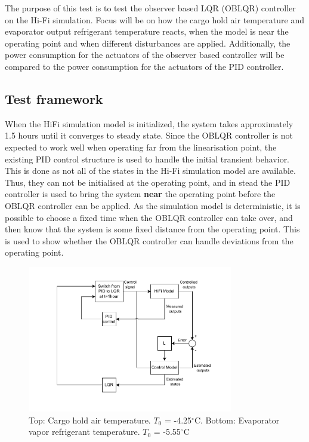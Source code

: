 The purpose of this test is to test the observer based LQR (OBLQR) controller on the Hi-Fi simulation. Focus will be on how the cargo hold air temperature and evaporator output refrigerant temperature reacts, when the model is near the operating point and when different disturbances are applied. Additionally, the power consumption for the actuators of the observer based controller will be compared to the power consumption for the actuators of the PID controller.

\subsection{Test framework}
When the HiFi simulation model is initialized, the system takes approximately 1.5 hours until it converges to steady state. Since the OBLQR controller is not expected to work well when operating far from the linearisation point, the existing PID control structure is used to handle the initial transient behavior. This is done as not all of the states in the Hi-Fi simulation model are available. Thus, they can not be initialised at the operating point, and in stead the PID controller is used to bring the system \textbf{near} the operating point before the OBLQR controller can be applied. 
As the simulation model is deterministic, it is possible to choose a fixed time when the OBLQR controller can take over, and then know that the system is some fixed distance from the operating point. This is used to show whether the OBLQR controller can handle deviations from the operating point.

\begin{figure}[h!]
	\centering
	\includegraphics[width=0.8\textwidth]{Graphics/HiFi_simulation_test_diagram.pdf}
	\caption{Top: Cargo hold air temperature. $T_0$ = -4.25$^{\circ}$C. Bottom: Evaporator vapor refrigerant temperature. $T_0$ = -5.55$^{\circ}$C}
	\label{fig:test_setup}
\end{figure}

